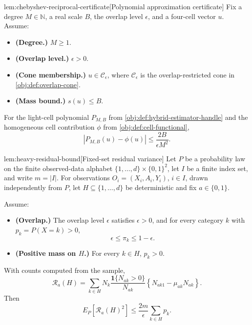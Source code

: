\begin{lemmav}{lem:chebyshev-reciprocal-certificate}[Polynomial approximation certificate]
Fix a degree \(M\in\mathbb N\), a real scale \(B\), the overlap level \(\epsilon\), and a four-cell vector \(u\). Assume:
\begin{itemize}
\item \textbf{(Degree.)} \(M\ge 1\).
\item \textbf{(Overlap level.)} \(\epsilon>0\).
\item \textbf{(Cone membership.)} \(u\in\mathcal C_\epsilon\), where \(\mathcal C_\epsilon\) is the overlap-restricted cone in \cref{obj:def:overlap-cone}.
\item \textbf{(Mass bound.)} \(s(u)\le B\).
\end{itemize}
For the light-cell polynomial \(P_{M,B}\) from \cref{obj:def:hybrid-estimator-handle} and the homogeneous cell contribution \(\phi\) from \cref{obj:def:cell-functional},
\[
\left|P_{M,B}(u)-\phi(u)\right|\le \frac{2B}{\epsilon M^2}.
\]
\end{lemmav}

\begin{lemmav}{lem:heavy-residual-bound}[Fixed-set residual variance]
Let \(P\) be a probability law on the finite observed-data alphabet
\(\{1,\ldots,d\}\times\{0,1\}^2\), let \(I\) be a finite index set, and write
\(m=|I|\).  For observations \(O_i=(X_i,A_i,Y_i)\), \(i\in I\), drawn independently
from \(P\), let \(H\subseteq\{1,\ldots,d\}\) be deterministic and fix
\(a\in\{0,1\}\).

Assume:
\begin{itemize}
\item \textbf{(Overlap.)} The overlap level \(\epsilon\) satisfies \(\epsilon>0\), and for every category \(k\) with \(p_k=P(X=k)>0\),
\[
\epsilon\le \pi_k\le 1-\epsilon .
\]
\item \textbf{(Positive mass on \(H\).)} For every \(k\in H\), \(p_k>0\).
\end{itemize}

With counts computed from the sample,
\[
\mathcal R_a(H)
=
\sum_{k\in H}
N_k\frac{\mathbf 1\{N_{ak}>0\}}{N_{ak}}
\left\{N_{ak1}-\mu_{ak}N_{ak}\right\}.
\]
Then
\[
E_P\!\left[\mathcal R_a(H)^2\right]
\le
\frac{2m}{\epsilon}\sum_{k\in H}p_k .
\]
\end{lemmav}

